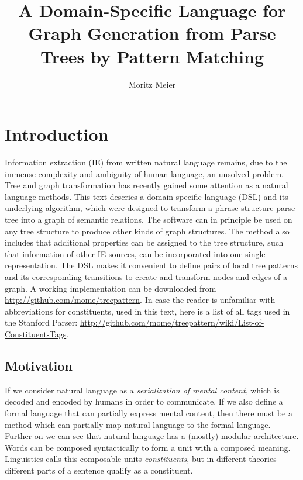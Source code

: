 \documentclass[english]{article}
\begin{document}
\title{A Domain-Specific Language for Graph Generation from Parse Trees by Pattern Matching}


\author{Moritz Meier}

\maketitle

\section{Introduction}

Information extraction (IE) from written natural language remains, due to the immense complexity and ambiguity of human language, an unsolved problem. Tree and graph transformation has recently gained some attention as a natural language methods\cite{ribeyre_linguistically-motivated_2012}. This text descries a domain-specific language (DSL) and its underlying algorithm, which were designed to transform a phrase structure parse-tree into a graph of semantic relations. The software can in principle be used on any tree structure to produce other kinds of graph structures. The method also includes that additional properties can be assigned to the tree structure, such that information of other IE sources, can be incorporated into one single representation. The DSL makes it convenient to define pairs of local tree patterns and its corresponding transitions to create and transform nodes and edges of a graph. A working implementation can be downloaded from \url{http://github.com/mome/treepattern}. In case the reader is unfamiliar with abbreviations for constituents, used in this text, here is a list of all tags used in the Stanford Parser: \url{http://github.com/mome/treepattern/wiki/List-of-Constituent-Tags}.


\subsection{Motivation}

If we consider natural language as a \textit{serialization of mental content}, which is decoded and encoded by humans in order to communicate. If we also define a formal language that can partially express mental content, then there must be a method which can partially map natural language to the formal language. Further on we can see that natural language has a (mostly) modular architecture. Words can be composed syntactically to form a unit with a composed meaning. Linguistics calls this composable units \textit{constituents}, but in different theories different parts of a sentence qualify as a constituent.
\end{document}
